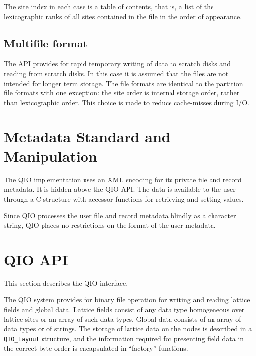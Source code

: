 \documentclass{article}
\begin{document}
The site index in each case is a table of contents, that is, a list of
the lexicographic ranks of all sites contained in the file in the
order of appearance.

\subsection{Multifile format}

The API provides for rapid temporary writing of data to scratch disks
and reading from scratch disks.  In this case it is assumed that the
files are not intended for longer term storage.  The file formats are
identical to the partition file formats with one exception: the site
order is internal storage order, rather than lexicographic order.
This choice is made to reduce cache-misses during I/O.

\section{Metadata Standard and Manipulation}

The QIO implementation uses an XML encoding for its private file and
record metadata.  It is hidden above the QIO API.  The data is
available to the user through a C structure with accessor functions
for retrieving and setting values.  

Since QIO processes the user file and record metadata blindly as a
character string, QIO places no restrictions on the format of the user
metadata.


\section{QIO API}

This section describes the QIO interface.

The QIO system provides for binary file operation for writing and
reading lattice fields and global data.  Lattice fields consist of any
data type homogeneous over lattice sites or an array of such data
types.  Global data consists of an array of data types or of strings.
The storage of lattice data on the nodes is described in a
\verb|QIO_Layout| structure, and the information required for
presenting field data in the correct byte order is encapsulated in
``factory'' functions.
\end{document}
